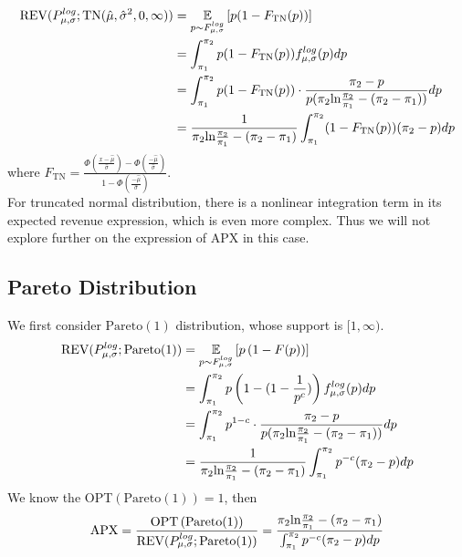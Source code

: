 \begin{equation}\notag
\begin{split}	
	\text{REV}(P^{log}_{\mu,\sigma} ;\text{TN}(\hat{\mu}, \hat{\sigma}^2, 0, \infty)) &=\underset{p \sim F^{log}_{\mu,\sigma} }{\mathbb{E}}\left[ p(1-F_{\text{TN}}(p))\right] \\ &= \int_{\pi_1}^{\pi_2} p(1 -  F_{\text{TN}}(p))f^{log}_{\mu,\sigma}(p)dp \\&=\int_{\pi_1}^{\pi_2} p(1 - F_{\text{TN}}(p) )\cdot \frac{\pi_2 -p}{p(\pi_2 \text{ln}\frac{\pi_2}{\pi_1} - (\pi_2-\pi_1))} dp \\&=  \frac{1}{\pi_2 \text{ln}\frac{\pi_2}{\pi_1} - (\pi_2-\pi_1)}\int_{\pi_1}^{\pi_2} (1 -  F_{\text{TN}}(p))(\pi_2-p)dp 
\end{split}
\end{equation} 
where $F_{\text{TN}} = \frac{\Phi(\frac{x- \hat{\mu}}{\hat{\sigma}}) - \Phi(\frac{- \hat{\mu}}{\hat{\sigma}})}{1 - \Phi(\frac{- \hat{\mu}}{\hat{\sigma}})}$.\\
For truncated normal distribution, there is a nonlinear integration term in its expected revenue expression, which is even more complex. Thus we will not explore further on the expression of APX in this case. 
\subsection{Pareto Distribution}
We first consider $\text{Pareto}(1)$ distribution, whose support is $[1, \infty)$. 
\begin{equation}\notag
\begin{split}	
	\text{REV}(P^{log}_{\mu,\sigma} ;\text{Pareto}(1)) &=\underset{p \sim F^{log}_{\mu,\sigma} }{\mathbb{E}}\left[ p\left(1-F(p)\right)\right] \\ &= \int_{\pi_1}^{\pi_2} p\left(1 -  (1-\frac{1}{p^c})\right)f^{log}_{\mu,\sigma}(p)dp \\&=\int_{\pi_1}^{\pi_2} p^{1-c}\cdot \frac{\pi_2 -p}{p(\pi_2 \text{ln}\frac{\pi_2}{\pi_1} - (\pi_2-\pi_1))} dp \\&=  \frac{1}{\pi_2 \text{ln}\frac{\pi_2}{\pi_1} - (\pi_2-\pi_1)}\int_{\pi_1}^{\pi_2} p^{-c}(\pi_2-p)dp 
\end{split}
\end{equation} 
We know the OPT$\left(\text{Pareto}(1)\right) = 1$, then
\begin{equation}\notag
    \text{APX} = \frac{\text{OPT}\left(\text{Pareto}(1)\right)}{\text{REV}(P^{log}_{\mu,\sigma} ;\text{Pareto}
    (1))} = \frac{\pi_2 \text{ln}\frac{\pi_2}{\pi_1} - (\pi_2-\pi_1)}{ \int_{\pi_1}^{\pi_2} p^{-c}(\pi_2-p)dp }
\end{equation}

